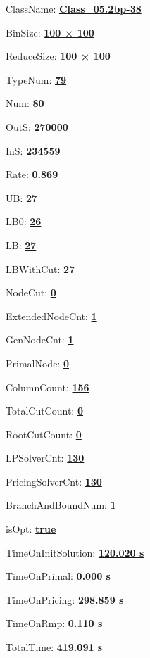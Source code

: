 \documentclass[11pt]{article}
\begin{document}
\pagestyle{empty}


ClassName: \underline{\textbf{Class_05.2bp-38}}
\par
BinSize: \underline{\textbf{100 × 100}}
\par
ReduceSize: \underline{\textbf{100 × 100}}
\par
TypeNum: \underline{\textbf{79}}
\par
Num: \underline{\textbf{80}}
\par
OutS: \underline{\textbf{270000}}
\par
InS: \underline{\textbf{234559}}
\par
Rate: \underline{\textbf{0.869}}
\par
UB: \underline{\textbf{27}}
\par
LB0: \underline{\textbf{26}}
\par
LB: \underline{\textbf{27}}
\par
LBWithCut: \underline{\textbf{27}}
\par
NodeCut: \underline{\textbf{0}}
\par
ExtendedNodeCnt: \underline{\textbf{1}}
\par
GenNodeCnt: \underline{\textbf{1}}
\par
PrimalNode: \underline{\textbf{0}}
\par
ColumnCount: \underline{\textbf{156}}
\par
TotalCutCount: \underline{\textbf{0}}
\par
RootCutCount: \underline{\textbf{0}}
\par
LPSolverCnt: \underline{\textbf{130}}
\par
PricingSolverCnt: \underline{\textbf{130}}
\par
BranchAndBoundNum: \underline{\textbf{1}}
\par
isOpt: \underline{\textbf{true}}
\par
TimeOnInitSolution: \underline{\textbf{120.020 s}}
\par
TimeOnPrimal: \underline{\textbf{0.000 s}}
\par
TimeOnPricing: \underline{\textbf{298.859 s}}
\par
TimeOnRmp: \underline{\textbf{0.110 s}}
\par
TotalTime: \underline{\textbf{419.091 s}}
\par
\newpage


\end{document}
